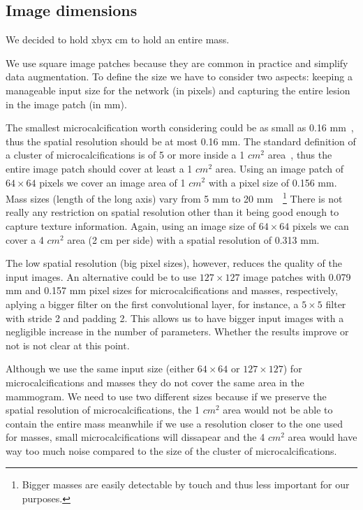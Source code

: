 \subsection{Image dimensions}
We decided to hold xbyx cm to hold an entire mass.


We use square image patches because they are common in practice and simplify data augmentation. To define the size we have to consider two aspects: keeping a manageable input size for the network (in pixels) and capturing the entire lesion in the image patch (in mm).

The smallest microcalcification worth considering could be as small as 0.16 mm~\cite{Lo1998}, thus the spatial resolution should be at most 0.16 mm. The standard definition of a cluster of microcalcifications is of 5 or more inside a 1 $cm^2$ area~\cite{Sickles2013}, thus the entire image patch should cover at least a 1 $cm^2$ area. Using an image patch of $64  \times 64$ pixels we cover an image area of 1 $cm^2$ with a pixel size of 0.156 mm. 
Mass sizes (length of the long axis) vary from 5 mm to 20 mm~\cite{Sahiner1996}~\footnote{Bigger masses are easily detectable by touch and thus less important for our purposes.} There is not really any restriction on spatial resolution other than it being good enough to capture texture information. Again, using an image size of $64 \times 64$ pixels we can cover a 4 $cm^2$ area (2 cm per side) with a spatial resolution of 0.313 mm.

The low spatial resolution (big pixel sizes), however, reduces the quality of the input images. An alternative could be to use $127 \times 127$ image patches with 0.079 mm and 0.157 mm pixel sizes for microcalcifications and masses, respectively, aplying a bigger filter on the first convolutional layer, for instance, a $5 \times 5$ filter with stride 2 and padding 2. This allows us to have bigger input images with a negligible increase in the number of parameters. Whether the results improve or not is not clear at this point.

Although we use the same input size (either $64 \times 64$ or $127 \times 127$) for microcalcifications and masses they do not cover the same area in the mammogram. We need to use two different sizes because if we preserve the spatial resolution of microcalcifications, the 1 $cm^2$ area would not be able to contain the entire mass meanwhile if we use a resolution closer to the one used for masses, small microcalcifications will dissapear and the 4 $cm^2$ area would have way too much noise compared to the size of the cluster of microcalcifications.

